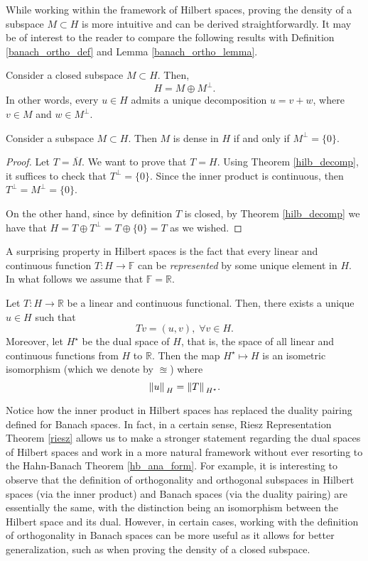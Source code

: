 While working within the framework of Hilbert spaces, proving the density of a subspace \(M \subset H\) is more intuitive and can be derived straightforwardly. It may be of interest to the reader to compare the following results with Definition \eqref{banach_ortho_def} and Lemma \ref{banach_ortho_lemma}.
\begin{theorem}\label{hilb_decomp}
    Consider a closed subspace \(M \subset H\). Then,
    \[
    H = M \oplus M^\perp.
    \]
    In other words, every \(u \in H\) admits a unique decomposition \(u = v + w\), where \(v \in M\) and \(w \in M^\perp\).
\end{theorem}
\begin{corollary}\label{hilb_dense}
    Consider a subspace \(M \subset H\). Then \(M\) is dense in \(H\) if and only if \(M^\perp = \{0\}\).
\end{corollary}
\begin{proof}
    Let \(T = \overline{M}\). We want to prove that \(T = H\). Using Theorem \ref{hilb_decomp}, it suffices to check that \(T^\perp = \{0\}\). Since the inner product is continuous, then \(T^\perp = M^\perp = \{0\}\).
    
    On the other hand, since by definition \(T\) is closed, by Theorem \ref*{hilb_decomp} we have that \(H = T \oplus T^\perp = T \oplus \{0\} = T\) as we wished.
\end{proof}
A surprising property in Hilbert spaces is the fact that every linear and continuous function \(T: H \rightarrow \mathbb{F}\) can be \textit{represented} by some unique element in \(H\). In what follows we assume that \(\mathbb{F} = \mathbb{R}\).
\begin{theorem}\label{riesz}
    Let \(T: H \rightarrow \mathbb{R}\) be a linear and continuous functional. Then, there exists a unique \(u \in H\) such that
    \[
        T v = (u, v), \; \forall v \in H.
    \]
    Moreover, let \(H^\star\) be the dual space of \(H\), that is, the space of all linear and continuous functions from \(H\) to \(\mathbb{R}\). Then the map \(H^\star \mapsto H\) is an isometric isomorphism (which we denote by \(\approxeq\)) where
    \[
        \norm*{u}_H = \norm*{T}_{H^\star}.
    \]
\end{theorem} 
\begin{remark}
    Notice how the inner product in Hilbert spaces has replaced the duality pairing defined for Banach spaces. In fact, in a certain sense, Riesz Representation Theorem \ref{riesz} allows us to make a stronger statement regarding the dual spaces of Hilbert spaces and work in a more natural framework without ever resorting to the Hahn-Banach Theorem \ref{hb_ana_form}. For example, it is interesting to observe that the definition of orthogonality and orthogonal subspaces in Hilbert spaces (via the inner product) and Banach spaces (via the duality pairing) are essentially the same, with the distinction being an isomorphism between the Hilbert space and its dual. However, in certain cases, working with the definition of orthogonality in Banach spaces can be more useful as it allows for better generalization, such as when proving the density of a closed subspace.
\end{remark}
